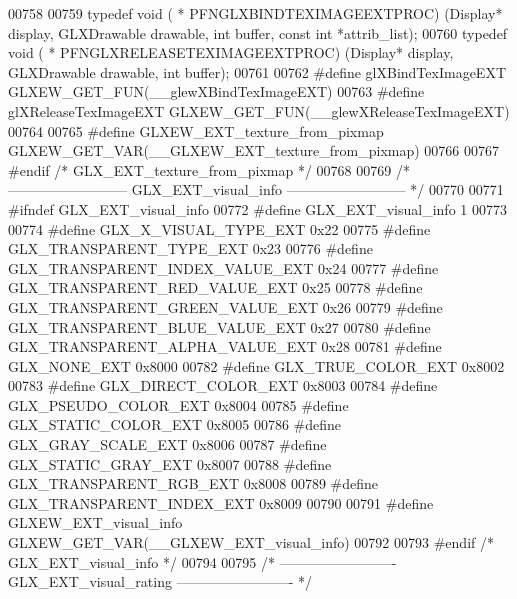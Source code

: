 \begin{DoxyCode}
00758 
00759 \textcolor{keyword}{typedef} void ( * PFNGLXBINDTEXIMAGEEXTPROC) (Display* display, GLXDrawable drawable, \textcolor{keywordtype}{int} 
      buffer, \textcolor{keyword}{const} \textcolor{keywordtype}{int} *attrib\_list);
00760 \textcolor{keyword}{typedef} void ( * PFNGLXRELEASETEXIMAGEEXTPROC) (Display* display, GLXDrawable drawable, \textcolor{keywordtype}{int} 
      buffer);
00761 
00762 \textcolor{preprocessor}{#define glXBindTexImageEXT GLXEW\_GET\_FUN(\_\_glewXBindTexImageEXT)}
00763 \textcolor{preprocessor}{#define glXReleaseTexImageEXT GLXEW\_GET\_FUN(\_\_glewXReleaseTexImageEXT)}
00764 
00765 \textcolor{preprocessor}{#define GLXEW\_EXT\_texture\_from\_pixmap GLXEW\_GET\_VAR(\_\_GLXEW\_EXT\_texture\_from\_pixmap)}
00766 
00767 \textcolor{preprocessor}{#endif }\textcolor{comment}{/* GLX\_EXT\_texture\_from\_pixmap */}\textcolor{preprocessor}{}
00768 
00769 \textcolor{comment}{/* -------------------------- GLX\_EXT\_visual\_info -------------------------- */}
00770 
00771 \textcolor{preprocessor}{#ifndef GLX\_EXT\_visual\_info}
00772 \textcolor{preprocessor}{#define GLX\_EXT\_visual\_info 1}
00773 
00774 \textcolor{preprocessor}{#define GLX\_X\_VISUAL\_TYPE\_EXT 0x22}
00775 \textcolor{preprocessor}{#define GLX\_TRANSPARENT\_TYPE\_EXT 0x23}
00776 \textcolor{preprocessor}{#define GLX\_TRANSPARENT\_INDEX\_VALUE\_EXT 0x24}
00777 \textcolor{preprocessor}{#define GLX\_TRANSPARENT\_RED\_VALUE\_EXT 0x25}
00778 \textcolor{preprocessor}{#define GLX\_TRANSPARENT\_GREEN\_VALUE\_EXT 0x26}
00779 \textcolor{preprocessor}{#define GLX\_TRANSPARENT\_BLUE\_VALUE\_EXT 0x27}
00780 \textcolor{preprocessor}{#define GLX\_TRANSPARENT\_ALPHA\_VALUE\_EXT 0x28}
00781 \textcolor{preprocessor}{#define GLX\_NONE\_EXT 0x8000}
00782 \textcolor{preprocessor}{#define GLX\_TRUE\_COLOR\_EXT 0x8002}
00783 \textcolor{preprocessor}{#define GLX\_DIRECT\_COLOR\_EXT 0x8003}
00784 \textcolor{preprocessor}{#define GLX\_PSEUDO\_COLOR\_EXT 0x8004}
00785 \textcolor{preprocessor}{#define GLX\_STATIC\_COLOR\_EXT 0x8005}
00786 \textcolor{preprocessor}{#define GLX\_GRAY\_SCALE\_EXT 0x8006}
00787 \textcolor{preprocessor}{#define GLX\_STATIC\_GRAY\_EXT 0x8007}
00788 \textcolor{preprocessor}{#define GLX\_TRANSPARENT\_RGB\_EXT 0x8008}
00789 \textcolor{preprocessor}{#define GLX\_TRANSPARENT\_INDEX\_EXT 0x8009}
00790 
00791 \textcolor{preprocessor}{#define GLXEW\_EXT\_visual\_info GLXEW\_GET\_VAR(\_\_GLXEW\_EXT\_visual\_info)}
00792 
00793 \textcolor{preprocessor}{#endif }\textcolor{comment}{/* GLX\_EXT\_visual\_info */}\textcolor{preprocessor}{}
00794 
00795 \textcolor{comment}{/* ------------------------- GLX\_EXT\_visual\_rating ------------------------- */}

\end{DoxyCode}
